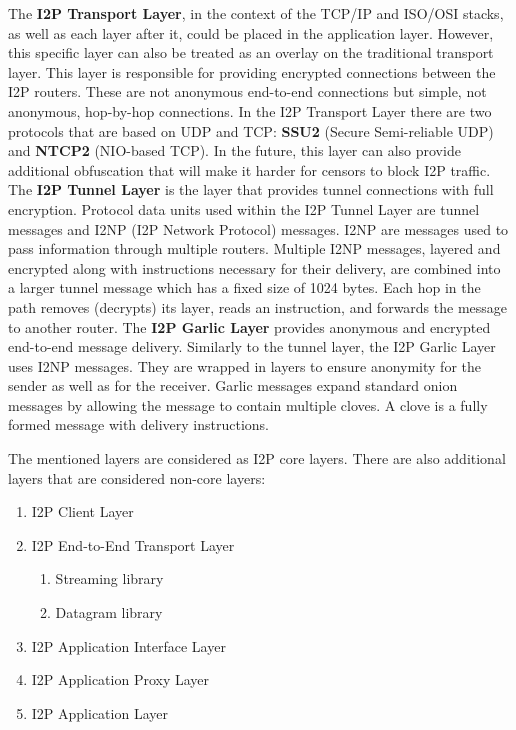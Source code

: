 The \textbf{I2P Transport Layer}, in the context of the TCP/IP and ISO/OSI stacks, as well as each layer after it, could be placed in the application layer. However, this specific layer can also be treated as an overlay on the traditional transport layer. This layer is responsible for providing encrypted connections between the I2P routers. These are not anonymous end-to-end connections but simple, not anonymous, hop-by-hop connections. In the I2P Transport Layer there are two protocols that are based on UDP and TCP: \textbf{SSU2} (Secure Semi-reliable UDP) and \textbf{NTCP2} (NIO-based TCP). In the future, this layer can also provide additional obfuscation that will make it harder for censors to block I2P traffic. The \textbf{I2P Tunnel Layer} is the layer that provides tunnel connections with full encryption. Protocol data units used within the I2P Tunnel Layer are tunnel messages and I2NP (I2P Network Protocol) messages. I2NP are messages used to pass information through multiple routers. Multiple I2NP messages, layered and encrypted along with instructions necessary for their delivery, are combined into a larger tunnel message which has a fixed size of 1024 bytes. Each hop in the path removes (decrypts) its layer, reads an instruction, and forwards the message to another router. The \textbf{I2P Garlic Layer} provides anonymous and encrypted end-to-end message delivery. Similarly to the tunnel layer, the I2P Garlic Layer uses I2NP messages. They are wrapped in layers to ensure anonymity for the sender as well as for the receiver. Garlic messages expand standard onion messages by allowing the message to contain multiple cloves. A clove is a fully formed message with delivery instructions.

The mentioned layers are considered as I2P core layers. There are also additional layers that are considered non-core layers:

\begin{enumerate}
\item I2P Client Layer
\item I2P End-to-End Transport Layer
\begin{enumerate}
\item Streaming library
\item Datagram library
\end{enumerate}
\item I2P Application Interface Layer
\item I2P Application Proxy Layer
\item I2P Application Layer
\end{enumerate}

